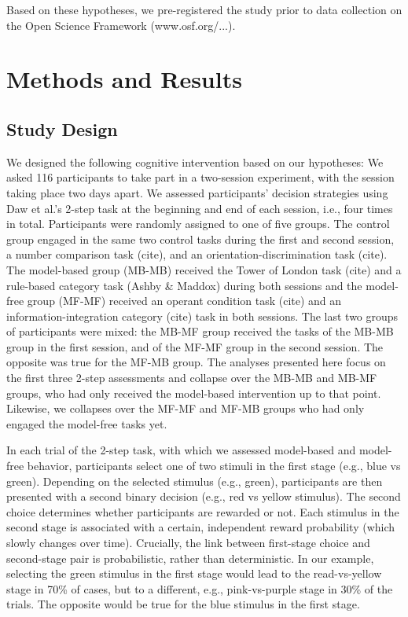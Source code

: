 \documentclass[11pt]{article} %
\begin{document}
Based on these hypotheses, we pre-registered the study prior to data collection on the Open Science Framework (www.osf.org/...).

\section{Methods and Results}
\subsection{Study Design}

We designed the following cognitive intervention based on our hypotheses: We asked 116 participants to take part in a two-session experiment, with the session taking place two days apart. We assessed participants' decision strategies using Daw et al.'s 2-step task at the beginning and end of each session, i.e., four times in total. Participants were randomly assigned to one of five groups. The control group engaged in the same two control tasks during the first and second session, a number comparison task (cite), and an orientation-discrimination task (cite). The model-based group (MB-MB) received the Tower of London task (cite) and a rule-based category task (Ashby \& Maddox) during both sessions and the model-free group (MF-MF) received an operant condition task (cite) and an information-integration category (cite) task in both sessions. The last two groups of participants were mixed: the MB-MF group received the tasks of the MB-MB group in the first session, and of the MF-MF group in the second session. The opposite was true for the MF-MB group. The analyses presented here focus on the first three 2-step assessments and collapse over the MB-MB and MB-MF groups, who had only received the model-based intervention up to that point. Likewise, we collapses over the MF-MF and MF-MB groups who had only engaged the model-free tasks yet.

In each trial of the 2-step task, with which we assessed model-based and model-free behavior, participants select one of two stimuli in the first stage (e.g., blue vs green). Depending on the selected stimulus (e.g., green), participants are then presented with a second binary decision (e.g., red vs yellow stimulus). The second choice determines whether participants are rewarded or not. Each stimulus in the second stage is associated with a certain, independent reward probability (which slowly changes over time). Crucially, the link between first-stage choice and second-stage pair is probabilistic, rather than deterministic. In our example, selecting the green stimulus in the first stage would lead to the read-vs-yellow stage in 70\% of cases, but to a different, e.g., pink-vs-purple stage in 30\% of the trials. The opposite would be true for the blue stimulus in the first stage.
\end{document}
